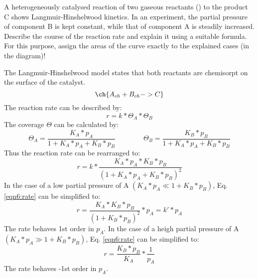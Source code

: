\begin{question}
A heterogeneously catalysed reaction of two gaseous reactants () to the product C shows Langmuir-Hinshelwood kinetics. In an experiment, the partial pressure of component B is kept constant, while that of component A is steadily increased. Describe the course of the reaction rate and explain it using a suitable formula.  For this purpose, assign the areas of the curve exactly to the explained cases (in the diagram)! 

\end{question}
\begin{solution}
The Langmuir-Hinshelwood model states that both reactants are chemisorpt on the surface of the catalyst.
\begin{equation*}
\ch{A_{ch} + B_{ch} -> C}
\end{equation*}
The reaction rate can be described by:
\begin{equation}
r = k * \Theta_A * \Theta_B
\end{equation}
The coverage $\Theta$ can be calculated by:
\begin{equation}
\Theta_A = \frac{K_A * p_A}{1 + K_A * p_A + K_B * p_B} \qquad\qquad \Theta_B = \frac{K_B * p_B}{1 + K_A * p_A + K_B * p_B} 
\end{equation}
Thus the reaction rate can be rearranged to:
\begin{equation}\label{eqn6:rate}
r = k * \frac{K_A * p_A * K_B * p_B}{(1 + K_A * p_A + K_B * p_B)^2}
\end{equation}
In the case of a low partial pressure of A $(K_A * p_A \ll 1 + K_B * p_B)$, Eq. \ref{eqn6:rate} can be simplified to:
\begin{equation}
r = \frac{K_A * K_B * p_B}{(1 + K_B * p_B)^2}*p_A = k' * p_A 
\end{equation}
The rate behaves 1st order in $p_A$. In the case of a heigh partial pressure of A $(K_A * p_A \gg 1 + K_B * p_B)$, Eq. \ref{eqn6:rate} can be simplified to:
\begin{equation}
r = \frac{K_B * p_B}{K_A} * \frac{1}{p_A}
\end{equation}
The rate behaves -1st order in $p_A$.
\begin{center}

\end{center}
\end{solution}